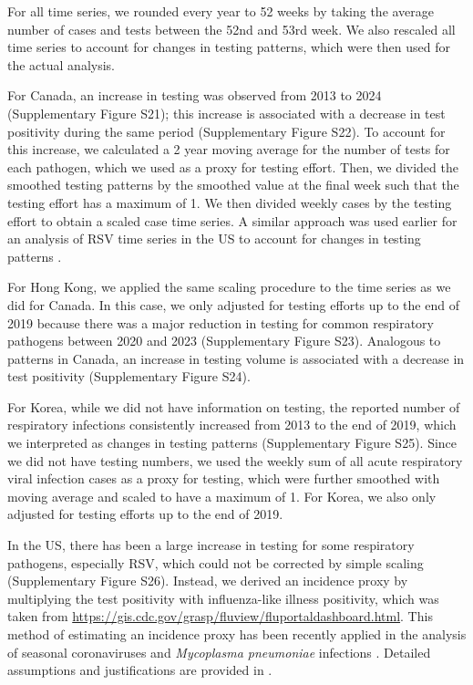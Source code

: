 \documentclass[12pt]{article}
\begin{document}
For all time series, we rounded every year to 52 weeks by taking the average number of cases and tests between the 52nd and 53rd week.
We also rescaled all time series to account for changes in testing patterns, which were then used for the actual analysis.

For Canada, an increase in testing was observed from 2013 to 2024 (Supplementary Figure S21);
this increase is associated with a decrease in test positivity during the same period (Supplementary Figure S22).
To account for this increase, we calculated a 2 year moving average for the number of tests for each pathogen, which we used as a proxy for testing effort.
Then, we divided the smoothed testing patterns by the smoothed value at the final week such that the testing effort has a maximum of 1.
We then divided weekly cases by the testing effort to obtain a scaled case time series.
A similar approach was used earlier for an analysis of RSV time series in the US to account for changes in testing patterns \citep{pitzer2015environmental}.

For Hong Kong, we applied the same scaling procedure to the time series as we did for Canada.
In this case, we only adjusted for testing efforts up to the end of 2019 because there was a major reduction in testing for common respiratory pathogens between 2020 and 2023 (Supplementary Figure S23).
Analogous to patterns in Canada, an increase in testing volume is associated with a decrease in test positivity (Supplementary Figure S24).

For Korea, while we did not have information on testing, the reported number of respiratory infections consistently increased from 2013 to the end of 2019, which we interpreted as changes in testing patterns (Supplementary Figure S25).
Since we did not have testing numbers, we used the weekly sum of all acute respiratory viral infection cases as a proxy for testing, which were further smoothed with moving average and scaled to have a maximum of 1.
For Korea, we also only adjusted for testing efforts up to the end of 2019.

In the US, there has been a large increase in testing for some respiratory pathogens, especially RSV, which could not be corrected by simple scaling (Supplementary Figure S26).
Instead, we derived an incidence proxy by multiplying the test positivity with influenza-like illness positivity, which was taken from \url{https://gis.cdc.gov/grasp/fluview/fluportaldashboard.html}.
This method of estimating an incidence proxy has been recently applied in the analysis of seasonal coronaviruses \citep{kissler2020projecting} and \textit{Mycoplasma pneumoniae} infections \citep{park2024predicting}.
Detailed assumptions and justifications are provided in \citep{goldstein2011predicting}.
\end{document}
